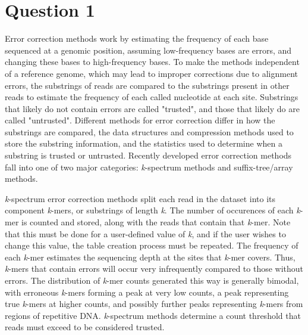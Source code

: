 \section{Question 1}

Error correction methods work by estimating the frequency of each base sequenced at a genomic position, assuming low-frequency bases are errors, and changing these bases to high-frequency bases.
To make the methods independent of a reference genome, which may lead to improper corrections due to alignment errors, the substrings of reads are compared to the substrings present in other reads to estimate the frequency of each called nucleotide at each site.
Substrings that likely do not contain errors are called "trusted", and those that likely do are called "untrusted".
Different methods for error correction differ in how the substrings are compared, the data structures and compression methods used to store the substring information, and the statistics used to determine when a substring is trusted or untrusted.
Recently developed error correction methods fall into one of two major categories: \textit{k}-spectrum methods and suffix-tree/array methods.

\textit{k}-spectrum error correction methods split each read in the dataset into its component \textit{k}-mers, or substrings of length \textit{k}. The number of occurences of each \textit{k}-mer is counted and stored, along with the reads that contain that \textit{k}-mer. Note that this must be done for a user-defined value of \textit{k}, and if the user wishes to change this value, the table creation process must be repeated.
The frequency of each \textit{k}-mer estimates the sequencing depth at the sites that \textit{k}-mer covers. Thus, \textit{k}-mers that contain errors will occur very infrequently compared to those without errors.
The distribution of \textit{k}-mer counts generated this way is generally bimodal, with erroneous \textit{k}-mers forming a peak at very low counts, a peak representing true \textit{k}-mers at higher counts, and possibly further peaks representing \textit{k}-mers from regions of repetitive DNA. \textit{k}-spectrum methods determine a count threshold that reads must exceed to be considered trusted.

